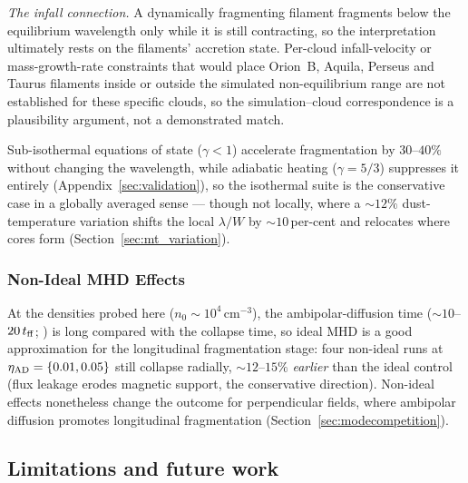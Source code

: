 \documentclass[usenatbib,twoside,twocolumn]{mnras}
\begin{document}
\emph{The infall connection.} A dynamically fragmenting filament fragments below the equilibrium wavelength only while it is still contracting, so the interpretation ultimately rests on the filaments' accretion state. Per-cloud infall-velocity or mass-growth-rate constraints that would place Orion~B, Aquila, Perseus and Taurus filaments inside or outside the simulated non-equilibrium range are not established for these specific clouds, so the simulation--cloud correspondence is a plausibility argument, not a demonstrated match.

Sub-isothermal equations of state ($\gamma<1$) accelerate fragmentation by $30$--$40\%$ without changing the wavelength, while adiabatic heating ($\gamma=5/3$) suppresses it entirely (Appendix~\ref{sec:validation}), so the isothermal suite is the conservative case in a globally averaged sense --- though not locally, where a $\sim12\%$ dust-temperature variation shifts the local $\lambda/W$ by $\sim10$\,per-cent and relocates where cores form (Section~\ref{sec:mt_variation}).

\subsubsection{Non-Ideal MHD Effects}
\label{sec:nonideal}

At the densities probed here ($n_0\sim10^4$\,cm$^{-3}$), the ambipolar-diffusion time ($\sim10$--$20\,t_{\rm ff}$; \citealt{Tassis2004}) is long compared with the collapse time, so ideal MHD is a good approximation for the longitudinal fragmentation stage: four non-ideal runs at $\eta_{\rm AD}=\{0.01,0.05\}$ still collapse radially, $\sim12$--$15\%$ \textit{earlier} than the ideal control (flux leakage erodes magnetic support, the conservative direction). Non-ideal effects nonetheless change the outcome for perpendicular fields, where ambipolar diffusion promotes longitudinal fragmentation (Section~\ref{sec:modecompetition}).

\subsection{Limitations and future work}
\label{sec:limitations}
\end{document}
